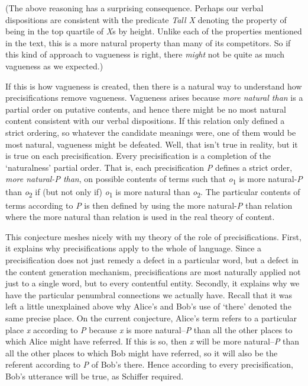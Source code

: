 \documentclass[
  10pt,
  letterpaper,
  DIV=11,
  numbers=noendperiod,
  twoside]{scrartcl}
\begin{document}
(The above reasoning has a surprising consequence. Perhaps our verbal
dispositions are consistent with the predicate \emph{Tall X} denoting
the property of being in the top quartile of \emph{X}s by height. Unlike
each of the properties mentioned in the text, this is a more natural
property than many of its competitors. So if this kind of approach to
vagueness is right, there \emph{might} not be quite as much vagueness as
we expected.)

If this is how vagueness is created, then there is a natural way to
understand how precisifications remove vagueness. Vagueness arises
because \emph{more natural than} is a partial order on putative
contents, and hence there might be no most natural content consistent
with our verbal dispositions. If this relation only defined a strict
ordering, so whatever the candidate meanings were, one of them would be
most natural, vagueness might be defeated. Well, that isn't true in
reality, but it is true on each precisification. Every precisification
is a completion of the `naturalness' partial order. That is, each
precisification \emph{P} defines a strict order, \emph{more natural-P
than}, on possible contents of terms such that \emph{o}\textsubscript{1}
is more natural-\emph{P} than \emph{o}\textsubscript{2} if (but not only
if) \emph{o}\textsubscript{1} is more natural than
\emph{o}\textsubscript{2}. The particular contents of terms according to
\emph{P} is then defined by using the more natural-\emph{P} than
relation where the more natural than relation is used in the real theory
of content.

This conjecture meshes nicely with my theory of the role of
precisifications. First, it explains why precisifications apply to the
whole of language. Since a precisification does not just remedy a defect
in a particular word, but a defect in the content generation mechanism,
precisifications are most naturally applied not just to a single word,
but to every contentful entity. Secondly, it explains why we have the
particular penumbral connections we actually have. Recall that it was
left a little unexplained above why Alice's and Bob's use of `there'
denoted the same precise place. On the current conjecture, Alice's term
refers to a particular place \emph{x} according to \emph{P} because
\emph{x} is more natural--\emph{P} than all the other places to which
Alice might have referred. If this is so, then \emph{x} will be more
natural--\emph{P} than all the other places to which Bob might have
referred, so it will also be the referent according to \emph{P} of Bob's
there. Hence according to every precisification, Bob's utterance will be
true, as Schiffer required.
\end{document}
